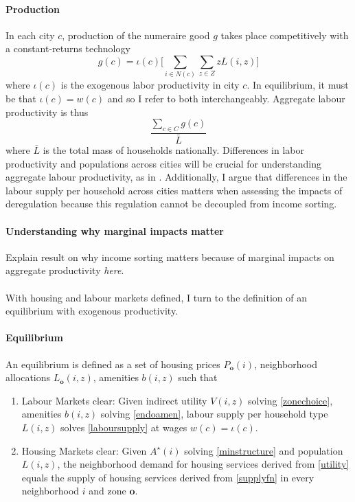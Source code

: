 \documentclass[12pt]{article}
\begin{document}
	\paragraph*{Production} In each city $c$, production of the numeraire good $g$ takes place competitively with a constant-returns technology
	\begin{equation}\label{production}
		g(c) = \iota(c)\bigg[\sum_{i \in N(c)}\sum_{z \in Z}zL(i, z)\bigg]
	\end{equation}
	where $\iota(c)$ is the exogenous labor productivity in city $c$. In equilibrium, it must be that $\iota(c) = w(c)$ and so I 	refer to both interchangeably. Aggregate labour productivity is thus 
	\begin{equation*}
		\frac{\sum_{c \in C}g(c)}{\bar{L}}
	\end{equation*}
	 where $\bar{L}$ is the total mass of households nationally. Differences in labor productivity and populations across cities will be crucial for understanding aggregate labour productivity, as in \cite{hseihmoretti}. Additionally, I argue that differences in the labour supply per household across cities matters when assessing the impacts of deregulation because this regulation cannot be decoupled from income sorting.
	 
	\paragraph*{Understanding why marginal impacts matter} 
	Explain result on why income sorting matters because of marginal impacts on aggregate productivity \textit{here}.
	
	
	\paragraph*{}
	With housing and labour markets defined, I turn to the definition of an equilibrium with exogenous productivity.

	\paragraph*{Equilibrium} An equilibrium is defined as a set of housing prices $P_{\boldsymbol{o}}(i)$, neighborhood allocations $L_{\boldsymbol{o}}(i, z)$, amenities $b(i, z)$ such that
	\begin{enumerate}
		\item Labour Markets clear: Given indirect utility $V(i, z)$ solving \eqref{zonechoice}, amenities $b(i, z)$ solving \eqref{endoamen}, labour supply per household type $L(i, z)$ solves \eqref{laboursupply} at wages $w(c) = \iota(c)$.
	
		\item Housing Markets clear: Given $A^{\star}(i)$ solving \eqref{minstructure} and population $L(i, z)$, the neighborhood demand for housing services derived from \eqref{utility} equals the supply of housing services derived from \eqref{supplyfn} in every neighborhood $i$ and zone $\boldsymbol{o}$. 
	\end{enumerate}
\end{document}
